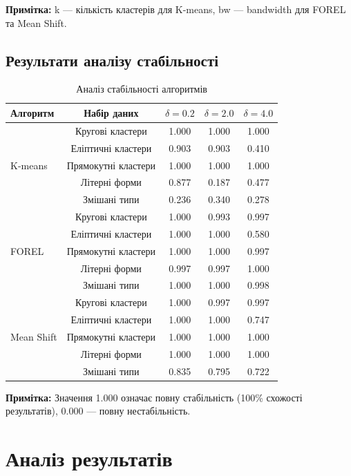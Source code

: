 \documentclass[12pt,a4paper]{article}
\begin{document}
\textbf{Примітка:} k — кількість кластерів для K-means, bw — bandwidth для FOREL та Mean Shift.

\subsection{Результати аналізу стабільності}

\begin{table}[H]
\centering
\caption{Аналіз стабільності алгоритмів}
\label{tab:stability}
\begin{tabular}{@{}lcccc@{}}
\toprule
\textbf{Алгоритм} & \textbf{Набір даних} & \textbf{$\delta=0.2$} & \textbf{$\delta=2.0$} & \textbf{$\delta=4.0$} \\
\midrule
\multirow{5}{*}{K-means} 
& Кругові кластери & 1.000 & 1.000 & 1.000 \\
& Еліптичні кластери & 0.903 & 0.903 & 0.410 \\
& Прямокутні кластери & 1.000 & 1.000 & 1.000 \\
& Літерні форми & 0.877 & 0.187 & 0.477 \\
& Змішані типи & 0.236 & 0.340 & 0.278 \\
\midrule
\multirow{5}{*}{FOREL} 
& Кругові кластери & 1.000 & 0.993 & 0.997 \\
& Еліптичні кластери & 1.000 & 1.000 & 0.580 \\
& Прямокутні кластери & 1.000 & 1.000 & 0.997 \\
& Літерні форми & 0.997 & 0.997 & 1.000 \\
& Змішані типи & 1.000 & 1.000 & 0.998 \\
\midrule
\multirow{5}{*}{Mean Shift} 
& Кругові кластери & 1.000 & 0.997 & 0.997 \\
& Еліптичні кластери & 1.000 & 1.000 & 0.747 \\
& Прямокутні кластери & 1.000 & 1.000 & 1.000 \\
& Літерні форми & 1.000 & 1.000 & 1.000 \\
& Змішані типи & 0.835 & 0.795 & 0.722 \\
\bottomrule
\end{tabular}
\end{table}

\textbf{Примітка:} Значення 1.000 означає повну стабільність (100\% схожості результатів), 0.000 — повну нестабільність.

\section{Аналіз результатів}
\end{document}
